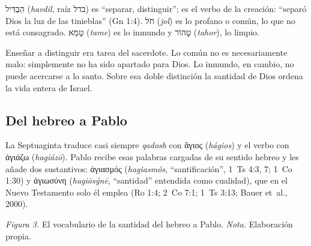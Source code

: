 \documentclass[11pt,letterpaper]{article}
\newcommand{\heb}[1]{\mbox{\foreignlanguage{hebrew}{#1}}}
\newcommand{\grc}[1]{\foreignlanguage{ancientgreek}{#1}}
\begin{document}
\begin{filologia}[Lv 10:10]
\heb{הַבְדִּיל} (\emph{havdil}, raíz \heb{בדל}) es ``separar, distinguir''; es el verbo de la creación: ``separó Dios la luz de las tinieblas'' (Gn 1:4). \heb{חֹל} (\emph{jol}) es lo profano o común, lo que no está consagrado. \heb{טָמֵא} (\emph{tame}) es lo inmundo y \heb{טָהוֹר} (\emph{tahor}), lo limpio.
\end{filologia}

Enseñar a distinguir era tarea del sacerdote. Lo común no es necesariamente malo: simplemente no ha sido apartado para Dios. Lo inmundo, en cambio, no puede acercarse a lo santo. Sobre esa doble distinción la santidad de Dios ordena la vida entera de Israel.

\subsection{Del hebreo a Pablo}
La Septuaginta traduce casi siempre \emph{qadosh} con \grc{ἅγιος} (\emph{hágios}) y el verbo con \grc{ἁγιάζω} (\emph{hagiázō}). Pablo recibe esas palabras cargadas de su sentido hebreo y les añade dos sustantivos: \grc{ἁγιασμός} (\emph{hagiasmós}, ``santificación'', 1~Ts 4:3, 7; 1~Co 1:30) y \grc{ἁγιωσύνη} (\emph{hagiōsýnē}, ``santidad'' entendida como cualidad), que en el Nuevo Testamento solo él emplea (Ro 1:4; 2~Co 7:1; 1~Ts 3:13; Bauer et~al., 2000).

\begin{center}
\par
{\footnotesize\color{gris}\textit{Figura 3.} El vocabulario de la santidad del hebreo a Pablo. \textit{Nota.} Elaboración propia.}
\end{center}
\end{document}
